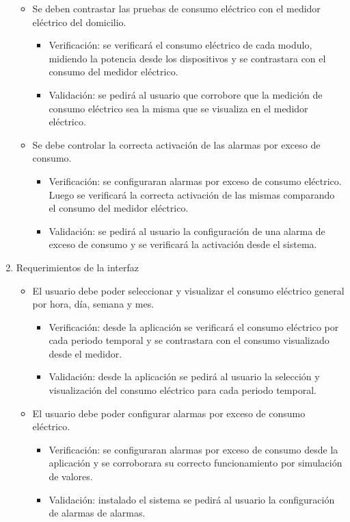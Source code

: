 \documentclass[
11pt, %
]{charter}
\begin{document}
\begin{enumerate}
\begin{itemize}
		\item Se deben contrastar las pruebas de consumo eléctrico con el medidor eléctrico del domicilio.
			\begin{itemize}
			\item Verificación: se verificará el consumo eléctrico de cada modulo, midiendo la potencia desde los dispositivos y se contrastara con el consumo del medidor eléctrico.
			\item Validación: se pedirá al usuario que corrobore que la medición de consumo eléctrico sea la misma que se visualiza en el medidor eléctrico.
			\end{itemize}
		\item Se debe controlar la correcta activación de las alarmas por exceso de consumo.
		\begin{itemize}
			\item Verificación: se configuraran alarmas por exceso de consumo eléctrico. Luego se verificará la correcta activación de las mismas comparando el consumo del medidor eléctrico.
			\item Validación: se pedirá al usuario la configuración de una alarma de exceso de consumo y se verificará la activación desde el sistema. 
			\end{itemize}				
		\end{itemize}
	\item Requerimientos de la interfaz
		\begin{itemize}
			\item El usuario debe poder seleccionar y visualizar el consumo eléctrico general por hora, día, semana y mes.
				\begin{itemize}
			\item Verificación: desde la aplicación se verificará el consumo eléctrico por cada periodo temporal y se contrastara con el consumo visualizado desde el medidor.
			\item Validación: desde la aplicación se pedirá al usuario la selección y visualización del consumo eléctrico para cada periodo temporal.
			\end{itemize}
			
			\item El usuario debe poder configurar alarmas por exceso de consumo eléctrico.	
			\begin{itemize}
			\item Verificación: se configuraran alarmas por exceso de consumo desde la aplicación y se corroborara su correcto funcionamiento por simulación de valores.
			\item Validación: instalado el sistema se pedirá al usuario la configuración de alarmas de alarmas.
			\end{itemize}
		 

\end{itemize}
\end{enumerate}
\end{document}
